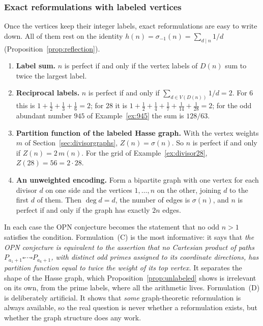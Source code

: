 \documentclass[11pt]{article}
\theoremstyle{definition}
\theoremstyle{remark}
\begin{document}
\subsubsection{Exact reformulations with labeled vertices}

Once the vertices keep their integer labels, exact reformulations are easy
to write down.  All of them rest on the identity
$h(n)=\sigma_{-1}(n)=\sum_{d\mid n}1/d$ (Proposition~\ref{prop:reflection}).

\begin{enumerate}[label=(\Alph*),leftmargin=2em]
\item \textbf{Label sum.}  $n$ is perfect if and only if the vertex labels of
  $D(n)$ sum to twice the largest label.
\item \textbf{Reciprocal labels.}  $n$ is perfect if and only if
  $\sum_{d\in V(D(n))}1/d=2$.  For $6$ this is
  $1+\tfrac12+\tfrac13+\tfrac16=2$; for $28$ it is
  $1+\tfrac12+\tfrac14+\tfrac17+\tfrac1{14}+\tfrac1{28}=2$; for the odd
  abundant number $945$ of Example~\ref{ex:945} the sum is $128/63$.
\item \textbf{Partition function of the labeled Hasse graph.}  With the vertex
  weights $m$ of Section~\ref{sec:divisorgraphs}, $Z(n)=\sigma(n)$.  So $n$ is
  perfect if and only if $Z(n)=2\,m(n)$.  For the grid of
  Example~\ref{ex:divisor28}, $Z(28)=56=2\cdot28$.
\item \textbf{An unweighted encoding.}  Form a bipartite graph with one
  vertex for each divisor $d$ on one side and the vertices $1,\dots,n$ on
  the other, joining $d$ to the first $d$ of them.  Then $\deg d=d$, the
  number of edges is $\sigma(n)$, and $n$ is perfect if and only if the
  graph has exactly $2n$ edges.
\end{enumerate}

\noindent
In each case the OPN conjecture becomes the statement that no odd $n>1$
satisfies the condition.  Formulation~(C) is the most informative: it says
that \emph{the OPN conjecture is equivalent to the assertion that no
Cartesian product of paths $P_{a_1+1}\square\cdots\square P_{a_k+1}$, with
distinct odd primes assigned to its coordinate directions, has partition
function equal to twice the weight of its top vertex.}  It separates the
shape of the Hasse graph, which Proposition~\ref{prop:unlabeled} shows is
irrelevant on its own, from the prime labels, where all the arithmetic
lives.  Formulation~(D) is deliberately artificial.  It shows that
\emph{some} graph-theoretic reformulation is always available, so the real
question is never whether a reformulation exists, but whether the graph
structure does any work.
\end{document}
